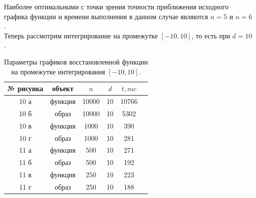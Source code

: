 \documentclass[a5paper, 10pt]{article}
\theoremstyle{definition}
\theoremstyle{plain}
\theoremstyle{remark}
\begin{document}
 Наиболее оптимальными с точки зрения точности приближения исходного графика функции и времени выполнения в данном случае являются $n=5$ и $n=6$.\\


Теперь рассмотрим интегрирование на промежутке $[-10, 10]$, то есть при $d=10$.





\begin{table}[h!]
\caption{Параметры графиков восстановленной функции на промежутке интегрирования $[-10, 10]$.}
\label{tabular:timesandtenses}
\begin{center}
\begin{tabular}{|c|c|c|c|c|c|}
\hline
№ рисунка & объект & $n$ & $d$ & $t, mc$  \\
\hline
 10 а&  функция &10000 & 10 &  10766\\
\hline
 10 б& образ & 10000 & 10 & 5302 \\
\hline
10 в  & функция & 1000 & 10 & 390 \\
\hline
10 г & образ & 1000  & 10 & 281 \\
\hline
11 а  &  функция &500 & 10 & 271 \\
\hline
11 б &образ & 500  & 10 & 192 \\
\hline
11 в & функция & 250  & 10 & 223 \\
\hline
11 г & образ & 250  & 10  &  188 \\
\hline
\end{tabular}
\end{center}
\end{table}
\end{document}
